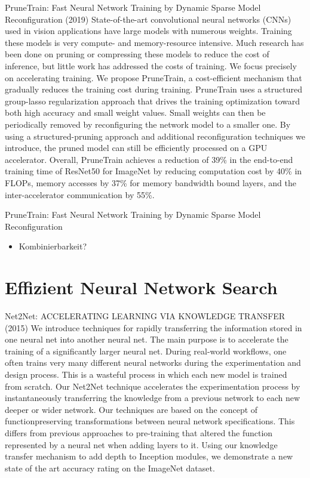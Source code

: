 \documentclass[10pt]{beamer}
\begin{document}
\begin{frame}{PruneTrain: Fast Neural Network Training by Dynamic Sparse Model Reconfiguration (2019)}
State-of-the-art convolutional neural networks (CNNs) used in vision applications have large models with numerous weights. Training these models is very compute- and memory-resource intensive.
Much research has been done on pruning or compressing these
models to reduce the cost of inference, but little work has addressed
the costs of training. We focus precisely on accelerating training.
We propose PruneTrain, a cost-efficient mechanism that gradually
reduces the training cost during training. PruneTrain uses a structured group-lasso regularization approach that drives the training optimization toward both high accuracy and small weight values. Small weights can then be periodically removed by reconfiguring the network model to a smaller one. By using a structured-pruning approach and additional reconfiguration techniques we introduce, the pruned model can still be efficiently processed on a GPU accelerator. Overall, PruneTrain achieves a reduction of 39\% in the end-to-end training time of ResNet50 for ImageNet by reducing computation cost by 40\% in FLOPs, memory accesses by 37\% for memory bandwidth bound layers, and the inter-accelerator communication by 55\%.
\end{frame}


\begin{frame}{PruneTrain: Fast Neural Network Training by Dynamic Sparse Model Reconfiguration}
 \begin{itemize}
  \item Kombinierbarkeit?
 \end{itemize}
\end{frame}

\section{Effizient Neural Network Search}

\begin{frame}{Net2Net: ACCELERATING LEARNING
VIA KNOWLEDGE TRANSFER (2015)}
 We introduce techniques for rapidly transferring the information stored in one neural net into another neural net. The main purpose is to accelerate the training of a significantly larger neural net. During real-world workflows, one often trains very many different neural networks during the experimentation and design process. This is a wasteful process in which each new model is trained from scratch. Our Net2Net technique accelerates the experimentation process by instantaneously transferring the knowledge from a previous network to each new deeper or wider network. Our techniques are based on the concept of functionpreserving transformations between neural network specifications. This differs from previous approaches to pre-training that altered the function represented by a neural net when adding layers to it. Using our knowledge transfer mechanism to add depth to Inception modules, we demonstrate a new state of the art accuracy rating on the ImageNet dataset.
\end{frame}
\end{document}
